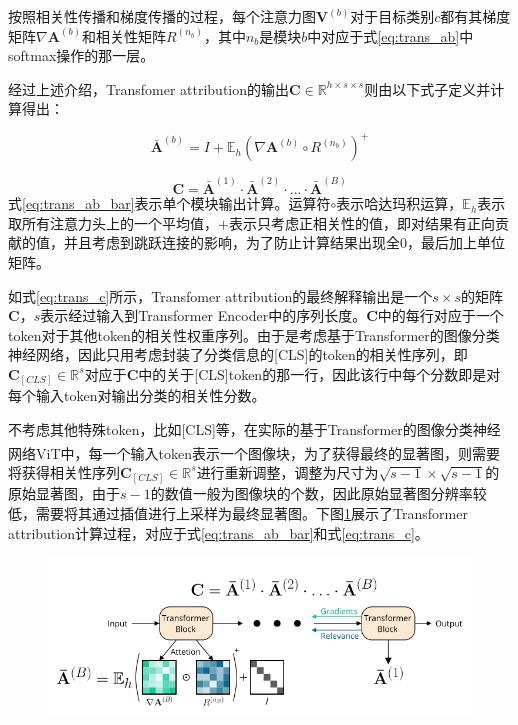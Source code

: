 按照相关性传播和梯度传播的过程，每个注意力图$\mathbf{V}^{(b)}$对于目标类别$c$都有其梯度矩阵$\nabla \mathbf{A}^{(b)}$和相关性矩阵$R^{(n_b)}$，其中$n_b$是模块$b$中对应于式\ref{eq:trans_ab}中softmax操作的那一层。

经过上述介绍，Transfomer attribution的输出$\mathbf{C} \in \mathbb{R}^{h\times s \times s}$则由以下式子定义并计算得出：

\begin{equation}
	\bar{\mathbf{A}}^{(b)} = I + \mathbb{E}_h(\nabla \mathbf{A}^{(b)} \circ R^{(n_b)})^+
	\label{eq:trans_ab_bar}
\end{equation}

\begin{equation}
	 \mathbf{C} = \bar{\mathbf{A}}^{(1)} \cdot \bar{\mathbf{A}}^{(2)} \cdot ... \cdot \bar{\mathbf{A}}^{(B)}
	\label{eq:trans_c}
\end{equation}
式\ref{eq:trans_ab_bar}表示单个模块输出计算。运算符$\circ$表示哈达玛积运算，$\mathbb{E}_h$表示取所有注意力头上的一个平均值，$+$表示只考虑正相关性的值，即对结果有正向贡献的值，并且考虑到跳跃连接的影响，为了防止计算结果出现全0，最后加上单位矩阵。

如式\ref{eq:trans_c}所示，Transfomer attribution的最终解释输出是一个$s\times s$的矩阵$\mathbf{C}$，$s$表示经过输入到Transformer Encoder中的序列长度。$\mathbf{C}$中的每行对应于一个token对于其他token的相关性权重序列。由于是考虑基于Transformer的图像分类神经网络，因此只用考虑封装了分类信息的[CLS]的token的相关性序列，即$\mathbf{C}_{[CLS]} \in \mathbb{R}^s$对应于$\mathbf{C}$中的关于[CLS]token的那一行，因此该行中每个分数即是对每个输入token对输出分类的相关性分数。

不考虑其他特殊token，比如[CLS]等，在实际的基于Transformer的图像分类神经网络ViT\textsuperscript{\cite{dosovitskiy2020image}}中，每一个输入token表示一个图像块，为了获得最终的显著图，则需要将获得相关性序列$\mathbf{C}_{[CLS]} \in \mathbb{R}^s$进行重新调整，调整为尺寸为$\sqrt{s-1}\times \sqrt{s-1}$的原始显著图，由于$s-1$的数值一般为图像块的个数，因此原始显著图分辨率较低，需要将其通过插值进行上采样为最终显著图。下图\ref{fig:trans1}展示了Transformer attribution计算过程，对应于式\ref{eq:trans_ab_bar}和式\ref{eq:trans_c}。
\begin{figure}[!ht]
	\centering 
	\includegraphics[width=15cm]{fig/ch2/trans1.png}
	\label{fig:trans1}
\end{figure}

